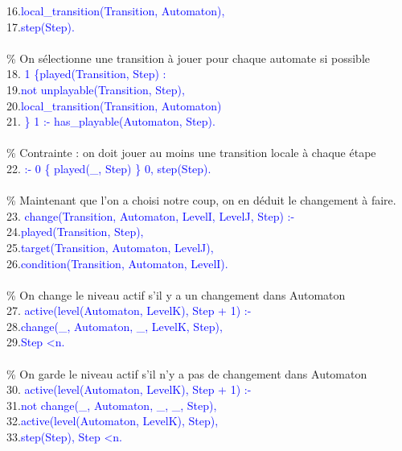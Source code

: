 \documentclass[12pt,a4paper]{article}
\begin{document}
{	16.\qquad\qquad\textcolor{blue}{local\_transition(Transition, Automaton),}\\
	17.\qquad\qquad\textcolor{blue}{step(Step).}\\ \\
	\% On sélectionne une transition à jouer pour chaque automate si possible\\
	18. \textcolor{blue}{1 \{played(Transition, Step) :}\\
	19.\qquad\qquad\textcolor{blue}{not unplayable(Transition, Step),}\\
	20.\qquad\qquad\textcolor{blue}{local\_transition(Transition, Automaton)}\\
	21. \textcolor{blue}{\} 1 :- has\_playable(Automaton, Step).}\\ \\
	\% Contrainte : on doit jouer au moins une transition locale à chaque étape\\
	22. \textcolor{blue}{:- 0 \{ played(\_, Step) \} 0, step(Step).}\\ \\
	\% Maintenant que l'on a choisi notre coup, on en déduit le changement à faire.\\
	23. \textcolor{blue}{change(Transition, Automaton, LevelI, LevelJ, Step) :-}\\
	24.\qquad\qquad\textcolor{blue}{played(Transition, Step),}\\
	25.\qquad\qquad\textcolor{blue}{target(Transition, Automaton, LevelJ),}\\
	26.\qquad\qquad\textcolor{blue}{condition(Transition, Automaton, LevelI).}\\ \\
	\% On change le niveau actif s'il y a un changement dans Automaton\\
	27. \textcolor{blue}{active(level(Automaton, LevelK), Step + 1) :-}\\
	28.\qquad\qquad\textcolor{blue}{change(\_, Automaton, \_, LevelK, Step),}\\
	29.\qquad\qquad\textcolor{blue}{Step \textless n.}\\ \\
	\% On garde le niveau actif s'il n'y a pas de changement dans Automaton\\
	30. \textcolor{blue}{active(level(Automaton, LevelK), Step + 1) :-}\\
	31.\qquad\qquad\textcolor{blue}{not change(\_, Automaton, \_, \_, Step),}\\
	32.\qquad\qquad\textcolor{blue}{active(level(Automaton, LevelK), Step),}\\
	33.\qquad\qquad\textcolor{blue}{step(Step), Step \textless n.}\\ \\
}
\end{document}
